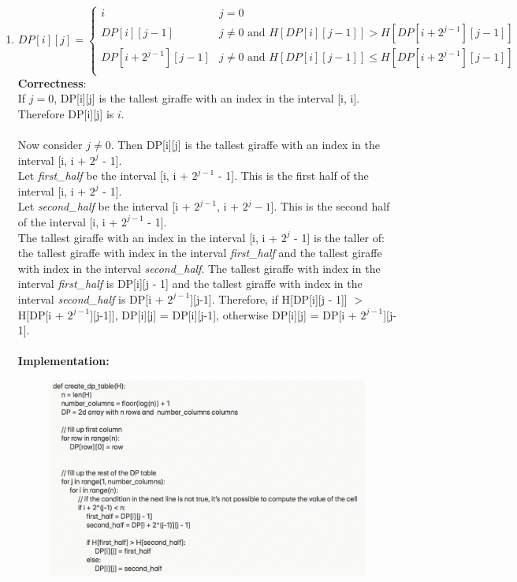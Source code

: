 \documentclass{article}
\begin{document}
\begin{enumerate}
\begin{enumerate}
    \newpage
    \item
    \[ DP[i][j] = \begin{cases} 
      i & j = 0 \\
       DP[i][j - 1] &j \neq 0 \text{ and } H[DP[i][j - 1]]  > H[DP[i + 2^{j-1}][j-1]]\\
       DP[i + 2^{j-1}][j-1] &j \neq 0 \text{ and } H[DP[i][j - 1]]  \leq H[DP[i + 2^{j-1}][j-1]]\\
   \end{cases}
\]\textbf{Correctness}:\\If $j = 0$, DP[i][j] is the tallest giraffe with an index in the interval [i, i].  Therefore DP[i][j] is $i$. \\ \\Now consider $j\neq 0$. Then DP[i][j] is the tallest giraffe with an index in the interval [i, i + $2^j$ - 1]. \\Let \textit{first\_half} be the interval [i, i + $2^{j-1}$ - 1]. This is the first half of the interval [i, i + $2^j$ - 1].\\ Let \textit{second\_half} be the interval [i + $2^{j-1}$, i + $2^{j} - 1$]. This is the second half of the interval [i, i + $2^{j-1}$ - 1].\\ The tallest giraffe with an index in the interval [i, i + $2^j$ - 1] is the taller of: the tallest giraffe with index in the interval \textit{first\_half} and the tallest giraffe with index in the interval \textit{second\_half}. The tallest giraffe with index in the interval \textit{first\_half} is DP[i][j - 1] and the tallest giraffe with index in the interval \textit{second\_half} is DP[i + $2^{j-1}$][j-1]. Therefore, if H[DP[i][j - 1]]  $>$ H[DP[i + $2^{j-1}$][j-1]], DP[i][j] = DP[i][j-1], otherwise DP[i][j] = DP[i + $2^{j-1}$][j-1].\\
\\
  \textbf{Implementation:}\\ 
  \begin{figure}[H]
    \includegraphics[width=15cm]{2b.png}

\end{figure}
\end{enumerate}
\end{enumerate}
\end{document}
